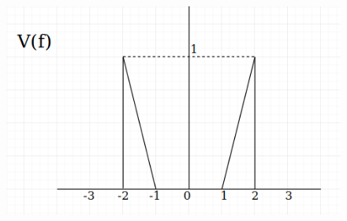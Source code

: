 \documentclass[12pt,a4paper]{article}
\begin{document}
	\begin{figure}[h!]
		\centering
		\includegraphics[scale=0.4]{./images/fourier38.png}
	\end{figure}
	\newpage
\end{document}
